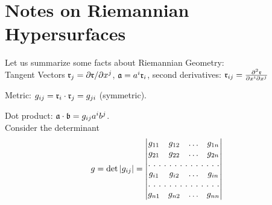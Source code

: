  \section{Notes on Riemannian Hypersurfaces}
 

 Let us summarize some facts about Riemannian Geometry:\\
 
Tangent Vectors $\mathfrak{r}_j= \partial\mathfrak{r}/\partial x^j $, $\mathfrak{a} = a^i\mathfrak{r}_i$, second derivatives: $\mathfrak{r}_{ij} = {\partial^2 \mathfrak{r}\over \partial x^i\partial x^j}$

Metric: $g_{ij}= \mathfrak{r}_i\cdot\mathfrak{r}_j = g_{ji}$ (symmetric).

Dot product: $\mathfrak{a}\cdot\mathfrak{b}= g_{ij} a^ib^j$.\\

Consider the determinant 
\begin{equation}
g = \det \left| \gij \right| =
\begin{vmatrix}
g_{11} & g_{12}  & \hdots & g_{1n}  \\
g_{21} & g_{22}  & \hdots & g_{2n}  \\
\hdotsfor[2]{4}\\
g_{i1} & g_{i2}  & \hdots & g_{in}  \\
\hdotsfor[2]{4}\\
g_{n1} & g_{n2}  & \hdots & g_{nn}  \\
\end{vmatrix}
\end{equation}






